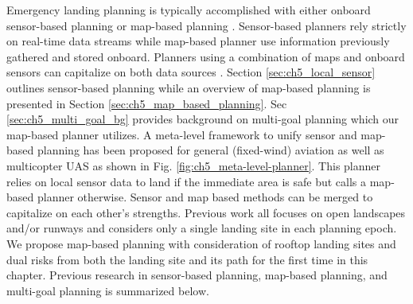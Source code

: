 Emergency landing planning is typically accomplished with either onboard sensor-based planning or map-based planning \cite{warren_enabling_2015, ten_harmsel_emergency_2017}.  Sensor-based planners rely strictly on real-time data streams while map-based planner use information previously gathered and stored onboard. Planners using a combination of maps and onboard sensors can capitalize on both data sources \cite{ten_harmsel_emergency_2017}.  Section \ref{sec:ch5_local_sensor} outlines sensor-based planning while an overview of map-based planning is presented in Section \ref{sec:ch5_map_based_planning}. Sec \ref{sec:ch5_multi_goal_bg} provides background on multi-goal planning which our map-based planner utilizes. A meta-level framework to unify sensor and map-based planning has been proposed for general (fixed-wind) aviation \cite{atkins_emergency_2006} as well as multicopter \ac{UAS} \cite{ten_harmsel_emergency_2017} as shown in Fig. \ref{fig:ch5_meta-level-planner}. This planner relies on local sensor data to land if the immediate area is safe but calls a map-based planner otherwise. Sensor and map based methods can be merged to capitalize on each other's strengths. Previous work all focuses on open landscapes and/or runways and considers only a single landing site in each planning epoch. We propose map-based planning with consideration of rooftop landing sites and dual risks from both the landing site and its path for the first time in this chapter.  Previous research in sensor-based planning, map-based planning, and multi-goal planning is summarized below.
